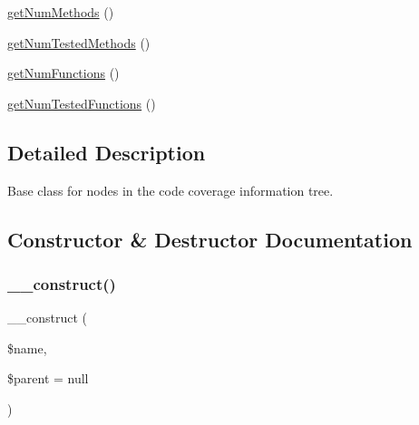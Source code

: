 \begin{DoxyCompactItemize}
\mbox{\hyperlink{class_sebastian_bergmann_1_1_code_coverage_1_1_node_1_1_abstract_node_a33d2a6d8c0d0dac6266c308b69500df8}{get\+Num\+Methods}} ()
\item 
\mbox{\hyperlink{class_sebastian_bergmann_1_1_code_coverage_1_1_node_1_1_abstract_node_a48f8ec1c354ab177280088a1ddf90439}{get\+Num\+Tested\+Methods}} ()
\item 
\mbox{\hyperlink{class_sebastian_bergmann_1_1_code_coverage_1_1_node_1_1_abstract_node_aa38acc99dd8fc7d59b28b396c2d9d07a}{get\+Num\+Functions}} ()
\item 
\mbox{\hyperlink{class_sebastian_bergmann_1_1_code_coverage_1_1_node_1_1_abstract_node_a6697408b128d1bb88427a2789d7bc6e8}{get\+Num\+Tested\+Functions}} ()
\end{DoxyCompactItemize}


\subsection{Detailed Description}
Base class for nodes in the code coverage information tree. 

\subsection{Constructor \& Destructor Documentation}
\mbox{\label{class_sebastian_bergmann_1_1_code_coverage_1_1_node_1_1_abstract_node_ab6558ed33f8b177c020a6fba5ce71678}} 
\subsubsection{\texorpdfstring{\+\_\+\+\_\+construct()}{\_\_construct()}}
{\footnotesize\ttfamily \+\_\+\+\_\+construct (\begin{DoxyParamCaption}\item[{}]{\$name,  }\item[{\mbox{\hyperlink{class_sebastian_bergmann_1_1_code_coverage_1_1_node_1_1_abstract_node}{Abstract\+Node}}}]{\$parent = {\ttfamily null} }\end{DoxyParamCaption})}

